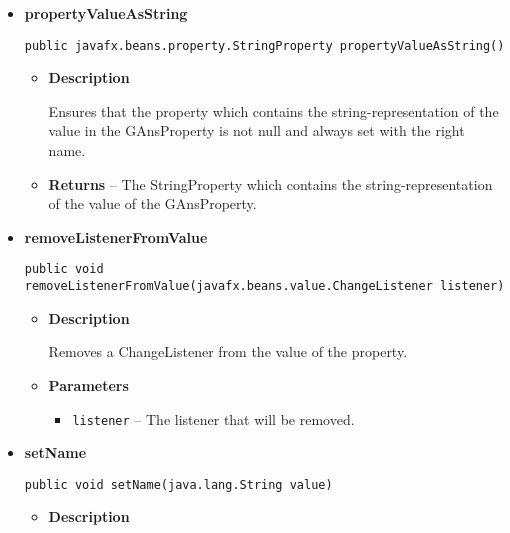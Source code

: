 {{{{{\begin{itemize}
{\begin{itemize}
{Ensures that the property which contains the value in the GAnsProperty is not null and always set with the right name.
}
\item{{\bf  Returns} -- 
The property which contains the value in the GAnsProperty. 
}%
\end{itemize}
}%
\item{ 
{\bf  propertyValueAsString}\\
\begin{lstlisting}[frame=none]
public javafx.beans.property.StringProperty propertyValueAsString()\end{lstlisting} %
\begin{itemize}
\item{
{\bf  Description}

Ensures that the property which contains the string-representation of the value in the GAnsProperty is not null and always set with the right name.
}
\item{{\bf  Returns} -- 
The StringProperty which contains the string-representation of the value of the GAnsProperty. 
}%
\end{itemize}
}%
\item{ 
{\bf  removeListenerFromValue}\\
\begin{lstlisting}[frame=none]
public void removeListenerFromValue(javafx.beans.value.ChangeListener listener)\end{lstlisting} %
\begin{itemize}
\item{
{\bf  Description}

Removes a ChangeListener from the value of the property.
}
\item{
{\bf  Parameters}
  \begin{itemize}
   \item{
\texttt{listener} -- The listener that will be removed.}
  \end{itemize}
}%
\end{itemize}
}%
\item{ 
{\bf  setName}\\
\begin{lstlisting}[frame=none]
public void setName(java.lang.String value)\end{lstlisting} %
\begin{itemize}
\item{
{\bf  Description}

}
\end{itemize}}
\end{itemize}}}}}}
